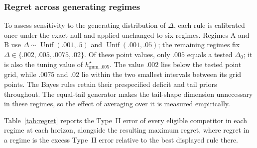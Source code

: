 \documentclass[11pt]{article}
\newcommand{\Unif}{\operatorname{Unif}}
\begin{document}
\FloatBarrier
\subsubsection{Regret across generating regimes}
\label{sec:regimes}

To assess sensitivity to the generating distribution of $\Delta$, each rule is calibrated once under the exact null and applied unchanged to six regimes.  Regimes A and B use $\Delta\sim\Unif(.001,.5)$ and $\Unif(.001,.05)$; the remaining regimes fix $\Delta\in\{.002,.005,.0075,.02\}$.  Of these point values, only $.005$ equals a tested $\Delta_0$; it is also the tuning value of $h^\star_{\mathrm{gum},.005}$.  The value $.002$ lies below the tested point grid, while $.0075$ and $.02$ lie within the two smallest intervals between its grid points.  The Bayes rules retain their prespecified deficit and tail priors throughout.  The equal-tail generator makes the tail-shape dimension unnecessary in these regimes, so the effect of averaging over it is measured empirically.

Table~\ref{tab:regret} reports the Type~II error of every eligible competitor in each regime at each horizon, alongside the resulting maximum regret, where regret in a regime is the excess Type~II error relative to the best displayed rule there.
\end{document}
